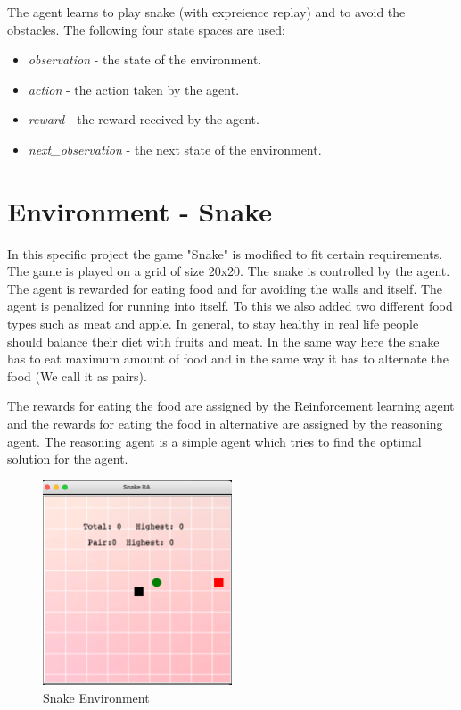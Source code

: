 \documentclass[11pt]{article}
\begin{document}
The agent learns to play snake (with expreience replay) and to avoid the obstacles. The following four state spaces are used:
\begin{itemize}
    \item \textit{observation} - the state of the environment.
    \item \textit{action} - the action taken by the agent.
    \item \textit{reward} - the reward received by the agent.
    \item \textit{next\_observation} - the next state of the environment.
\end{itemize}
\section{Environment - Snake}
In this specific project the game "Snake" is modified to fit certain requirements. The game is played on a grid of size 20x20. 
The snake is controlled by the agent. The agent is rewarded for eating food and for avoiding the walls and itself. 
The agent is penalized for running into itself. To this we also added two different food types such as meat and apple. In general,
to stay healthy in real life people should balance their diet with fruits and meat. In the same way here the snake has to eat maximum amount of food and
in the same way it has to alternate the food (We call it as pairs).

The rewards for eating the food are assigned by the Reinforcement learning agent  and the rewards for eating the food in alternative are assigned by the reasoning agent. 
The reasoning agent is a simple agent which tries to find the optimal solution for the agent.
\begin{figure}[h]
    \centering
    \includegraphics[width=0.5\textwidth]{env}
    \caption{Snake Environment}
    \label{fig:snake_env}
\end{figure}
\end{document}
